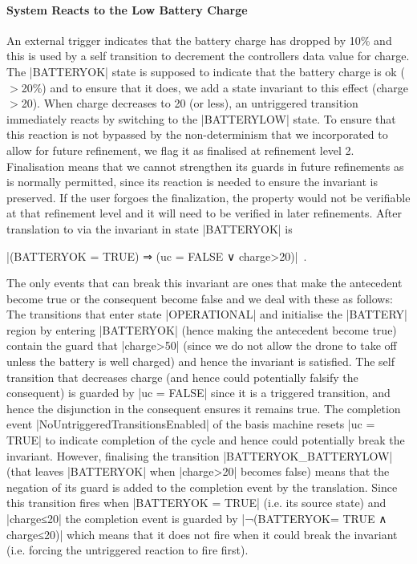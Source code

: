 \paragraph{System Reacts to the Low Battery Charge}
An external trigger indicates that the battery charge has dropped by 10\% and this is used by a self transition to decrement the controllers data value for charge.
The |BATTERYOK| state is supposed to indicate that the battery charge is ok ($>$20\%) and to ensure that it does, we add a state invariant to this effect (charge$>$20).
When charge decreases to 20 (or less), an untriggered transition immediately reacts by switching to the |BATTERYLOW| state.
To ensure that this reaction is not bypassed by the non-determinism that we incorporated to allow for future refinement, we flag it as finalised at refinement level 2.
Finalisation means that we cannot strengthen its guards in future refinements as is normally permitted, since its reaction is needed to ensure the invariant is preserved. If the user forgoes the finalization, the property would not be verifiable at that refinement level and it will need to be verified in later refinements.
After translation to 
\EVENTB via \UMLB
the invariant in state |BATTERYOK| is 
\begin{center}
 |(BATTERYOK = TRUE) ⇒ (uc = FALSE ∨ charge>20)|~.
\end{center}
The only events that can break this invariant are ones that make the antecedent become true or the consequent become false and we deal with these as follows:
The transitions that enter state |OPERATIONAL| and initialise the |BATTERY| region by entering |BATTERYOK| (hence making the antecedent become true) contain the guard that |charge>50| (since we do not allow the drone to take off unless the battery is well charged) and hence the invariant is satisfied.
The self transition that decreases charge (and hence could potentially falsify the consequent) is guarded by |uc = FALSE| since it is a triggered transition, and hence the disjunction in the consequent ensures it remains true.
The completion event |NoUntriggeredTransitionsEnabled| of the basis machine resets |uc = TRUE| to indicate completion of the cycle and hence could potentially break the invariant. 
However, finalising the transition |BATTERYOK_BATTERYLOW| (that leaves |BATTERYOK| when |charge>20| becomes false) means that  the negation of its guard is added to the completion event by the translation.
Since this transition fires when |BATTERYOK = TRUE| (i.e. its source state) and |charge≤20| the completion event is guarded by |¬(BATTERYOK= TRUE ∧ charge≤20)| which means that it does not fire when it could break the invariant (i.e. forcing the untriggered reaction to fire first).

